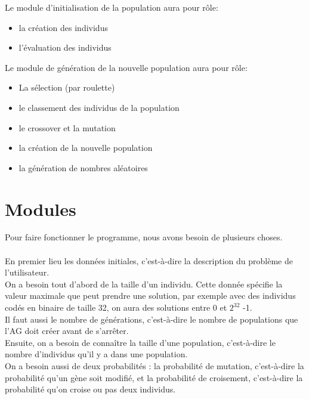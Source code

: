 \documentclass[a4paper,11pt]{article}
\begin{document}
		Le module d’initialisation de la population aura pour rôle:
		\begin{itemize}
				\item la création des individus
				\item l’évaluation des individus\\
		\end{itemize}
		Le module de génération de la nouvelle population aura pour rôle:
		\begin{itemize}
				\item La sélection (par roulette)
				\item le classement des individus de la population
				\item le crossover et la mutation
				\item la création de la nouvelle population
				\item la génération de nombres aléatoires\\
		\end{itemize}
		
	\section{Modules}
		Pour faire fonctionner le programme, nous avons besoin de plusieurs choses.\\
		\\

		En premier lieu les données initiales, c'est-à-dire la description du problème de l'utilisateur.\\
		On a besoin tout d’abord de la taille d’un individu. 
		Cette donnée spécifie la valeur maximale que peut prendre une solution, par exemple avec des individus codés en binaire de taille 32, on aura des solutions entre 0 et $2^{32}$ -1.\\
		Il faut aussi le nombre de générations, c’est-à-dire le nombre de populations que l’AG doit créer avant de s’arrêter.\\

		Ensuite, on a besoin de connaître la taille d’une population, c’est-à-dire le nombre d’individus qu’il y a dans une population.\\
		On a besoin aussi de deux probabilités : la probabilité de mutation, c’est-à-dire la probabilité qu’un gène soit modifié, et la probabilité de croisement, c’est-à-dire la probabilité qu’on croise ou pas deux individus. 
		
\end{document}
